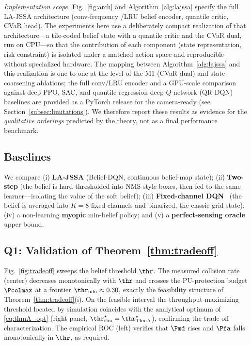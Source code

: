 \emph{Implementation scope.} Fig.~\ref{fig:arch} and
Algorithm~\ref{alg:lajssa} specify the full LA-JSSA architecture (conv-frequency
/LRU belief encoder, quantile critic, CVaR head). The experiments here use a
deliberately compact realization of that architecture---a tile-coded belief
state with a quantile critic and the CVaR dual, run on CPU---so that the
contribution of each component (state representation, risk constraint) is
isolated under a matched action space and reproducible without specialized
hardware. The mapping between Algorithm~\ref{alg:lajssa} and this realization
is one-to-one at the level of the M1 (CVaR dual) and state-coarsening
ablations; the full conv/LRU encoder and a GPU-scale comparison against deep
PPO, SAC, and quantile-regression deep-$Q$-network (QR-DQN) baselines are
provided as a PyTorch release for the camera-ready (see
Section~\ref{subsec:limitations}). We therefore report these results as
evidence for the \emph{qualitative orderings} predicted by the theory, not as
a final performance benchmark.

\subsection{Baselines}
We compare (i) \textbf{LA-JSSA} (Belief-DQN, continuous belief-map state);
(ii) \textbf{Two-step} (the belief is hard-thresholded into NMS-style boxes,
then fed to the same learner---isolating the value of the soft belief);
(iii) \textbf{Fixed-channel DQN}~\cite{wang2018} (the belief is averaged into
$K=8$ fixed channels and binarized, the classic grid state);
(iv) a non-learning \textbf{myopic} min-belief policy; and (v) a
\textbf{perfect-sensing oracle} upper bound.

\subsection{Q1: Validation of Theorem~\ref{thm:tradeoff}}
Fig.~\ref{fig:tradeoff} sweeps the belief threshold $\thr$. The measured
collision rate (center) decreases monotonically with $\thr$ and crosses the
PU-protection budget $\Pcolmax$ at a frontier $\thr_{\min}\approx0.30$,
exactly the feasibility structure of Theorem~\ref{thm:tradeoff}(i). On the
feasible interval the throughput-maximizing threshold located by simulation
coincides with the analytical optimum of \eqref{eq:thmA_opt} (right panel,
$\thr^\star_{\mathrm{sim}}=\thr^\star_{\mathrm{Thm A}}$), confirming the
trade-off characterization. The empirical ROC (left) verifies that $\Pmd$
rises and $\Pfa$ falls monotonically in $\thr$, as required.

